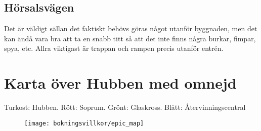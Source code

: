 \subsection{Hörsalsvägen}
Det är väldigt sällan det faktiskt behövs göras något utanför byggnaden, men det kan ändå vara bra att ta en snabb titt så att det inte finns några burkar, fimpar, spya, etc. Allra viktigast är trappan och rampen precis utanför entrén.

\newpage
\section{Karta över Hubben med omnejd}
Turkost: Hubben. Rött: Soprum. Grönt: Glaskross. Blått: Återvinningscentral
\begin{figure}[h]
    \centering
    \texttt{[image: bokningsvillkor/epic\_map]}
    \label{fig:map}
\end{figure}
